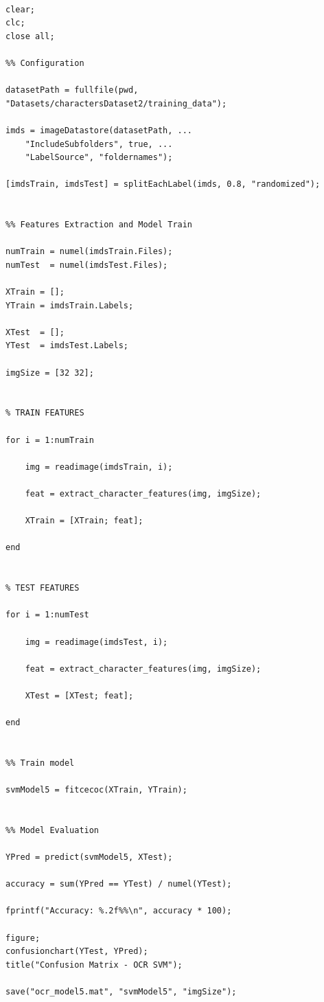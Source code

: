 \begin{verbatim}

clear;
clc;
close all;

%% Configuration

datasetPath = fullfile(pwd, "Datasets/charactersDataset2/training_data");

imds = imageDatastore(datasetPath, ...
    "IncludeSubfolders", true, ...
    "LabelSource", "foldernames");

[imdsTrain, imdsTest] = splitEachLabel(imds, 0.8, "randomized");


%% Features Extraction and Model Train

numTrain = numel(imdsTrain.Files);
numTest  = numel(imdsTest.Files);

XTrain = [];
YTrain = imdsTrain.Labels;

XTest  = [];
YTest  = imdsTest.Labels;

imgSize = [32 32];


% TRAIN FEATURES

for i = 1:numTrain

    img = readimage(imdsTrain, i);

    feat = extract_character_features(img, imgSize);

    XTrain = [XTrain; feat];

end


% TEST FEATURES 

for i = 1:numTest

    img = readimage(imdsTest, i);

    feat = extract_character_features(img, imgSize);

    XTest = [XTest; feat];

end


%% Train model 

svmModel5 = fitcecoc(XTrain, YTrain);


%% Model Evaluation

YPred = predict(svmModel5, XTest);

accuracy = sum(YPred == YTest) / numel(YTest);

fprintf("Accuracy: %.2f%%\n", accuracy * 100);

figure;
confusionchart(YTest, YPred);
title("Confusion Matrix - OCR SVM");

save("ocr_model5.mat", "svmModel5", "imgSize");
    
\end{verbatim}
